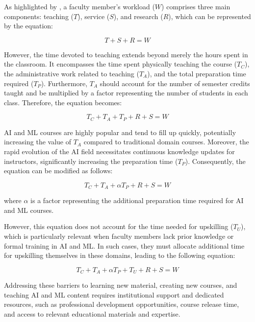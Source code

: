 \documentclass[11pt]{article}
\begin{document}
As highlighted by \cite{griffith2020framework}, a faculty member's workload ($W$) comprises three main components: teaching ($T$), service ($S$), and research ($R$), which can be represented by the equation:

\begin{equation}
    T + S + R = W
\end{equation}

However, the time devoted to teaching extends beyond merely the hours spent in the classroom. It encompasses the time spent physically teaching the course ($T_C$), the administrative work related to teaching ($T_A$), and the total preparation time required ($T_P$). Furthermore, $T_A$ should account for the number of semester credits taught and be multiplied by a factor representing the number of students in each class. Therefore, the equation becomes:

\begin{equation}
    T_C + T_A + T_P + R + S = W
\end{equation}

AI and ML courses are highly popular and tend to fill up quickly, potentially increasing the value of $T_A$ compared to traditional domain courses. Moreover, the rapid evolution of the AI field necessitates continuous knowledge updates for instructors, significantly increasing the preparation time ($T_P$). Consequently, the equation can be modified as follows:

\begin{equation}
    T_C + T_A + \alpha T_P + R + S = W
\end{equation}

where $\alpha$ is a factor representing the additional preparation time required for AI and ML courses.

However, this equation does not account for the time needed for upskilling ($T_U$), which is particularly relevant when faculty members lack prior knowledge or formal training in AI and ML. In such cases, they must allocate additional time for upskilling themselves in these domains, leading to the following equation:

\begin{equation}
    T_C + T_A + \alpha T_P + T_U + R + S = W
\end{equation}

Addressing these barriers to learning new material, creating new courses, and teaching AI and ML content requires institutional support and dedicated resources, such as professional development opportunities, course release time, and access to relevant educational materials and expertise.
\end{document}
